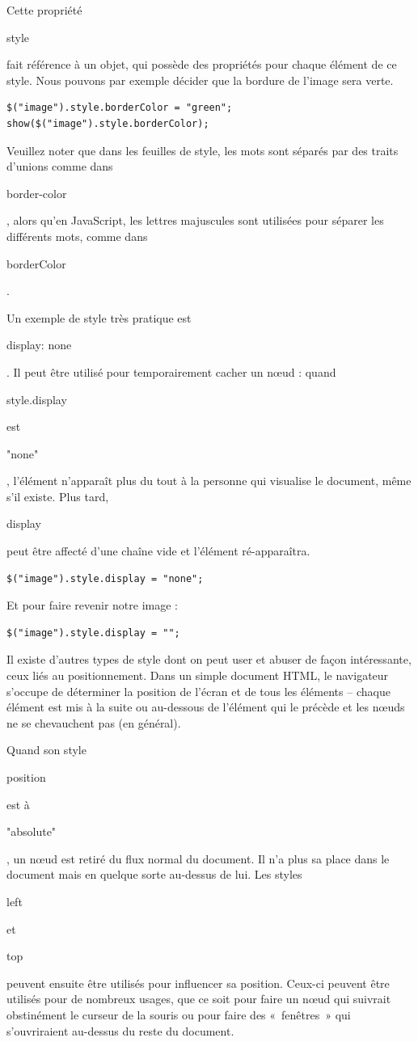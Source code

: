 \documentclass{FramateX}
\renewcommand{\texttt}[1]{\begin{sffamily}{#1}\end{sffamily}}
\begin{document}
Cette propriété \texttt{style} fait référence à un objet, qui possède
des propriétés pour chaque élément de ce style. Nous pouvons par exemple
décider que la bordure de l'image sera verte.

\begin{lstlisting}
$("image").style.borderColor = "green";
show($("image").style.borderColor);
\end{lstlisting}
Veuillez noter que dans les feuilles de style, les mots sont séparés par
des traits d'unions comme dans \texttt{border-color}, alors qu'en
JavaScript, les lettres majuscules sont utilisées pour séparer les
différents mots, comme dans \texttt{borderColor}.

Un exemple de style très pratique est \texttt{display: none}. Il peut
être utilisé pour temporairement cacher un nœud : quand
\texttt{style.display} est \texttt{"none"}, l'élément n'apparaît plus du
tout à la personne qui visualise le document, même s'il existe. Plus
tard, \texttt{display} peut être affecté d'une chaîne vide et l'élément
ré-apparaîtra.

\begin{lstlisting}
$("image").style.display = "none";
\end{lstlisting}
Et pour faire revenir notre image :

\begin{lstlisting}
$("image").style.display = "";
\end{lstlisting}
\begin{center}\end{center}

Il existe d'autres types de style dont on peut user et abuser de façon
intéressante, ceux liés au positionnement. Dans un simple document HTML,
le navigateur s'occupe de déterminer la position de l'écran et de tous
les éléments -- chaque élément est mis à la suite ou au-dessous de
l'élément qui le précède et les nœuds ne se chevauchent pas (en
général).

Quand son style \texttt{position} est à \texttt{"absolute"}, un nœud est
retiré du flux normal du document. Il n'a plus sa place dans le document
mais en quelque sorte au-dessus de lui. Les styles \texttt{left} et
\texttt{top} peuvent ensuite être utilisés pour influencer sa position.
Ceux-ci peuvent être utilisés pour de nombreux usages, que ce soit pour
faire un nœud qui suivrait obstinément le curseur de la souris ou pour
faire des «~fenêtres~» qui s'ouvriraient au-dessus du reste du document.
\end{document}
